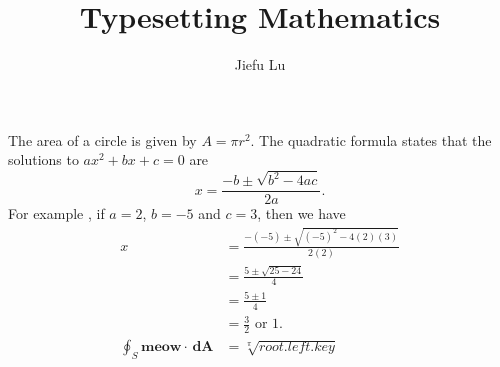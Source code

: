 \documentclass[12pt]{article}
\title{Typesetting Mathematics}
\author{Jiefu Lu}
\begin{document}
\maketitle
The area of a circle is given by $A = \pi r ^2$.
The quadratic formula states that the solutions to \( ax ^2 + bx + c = 0\) are \[ x = \frac{-b \pm \sqrt{b^2 -4 ac }}{2 a}. \]
For example , if $a = 2$, $b = -5$ and $c = 3$, then we have
\begin{align*}
x &= \frac { -( -5) \pm \sqrt{( -5) ^2 - 4(2)(3)}}{2(2)}\\
&= \frac{5 \pm \sqrt{25 -24}}{4}\\
&= \frac{5 \pm 1}{4}\\
&= \frac{3}{2}\text{ or } 1.\\
\oint_S \mathbf{meow}\cdot\,\mathbf{dA} &= \sqrt[\pi]{\textit{root.left.key}}
\end{align*}
\end{document}
